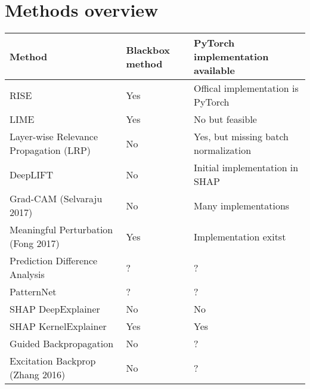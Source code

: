 \section{Methods overview}

\begin{tabular}{| p{7cm} | p{2.5cm} | p{6cm} | }
\hline
\textbf{Method} & \textbf{Blackbox method} & \textbf{PyTorch implementation available} \\ \hline

RISE\cite{Petsiuk2018rise} & Yes & Offical implementation is PyTorch \\ \hline
LIME\cite{ribeiro2016should} & Yes & No but feasible \\ \hline
Layer-wise Relevance Propagation (LRP) & No & Yes, but missing batch normalization\cite{lrppytorch} \\ \hline
DeepLIFT\cite{shrikumar2017learning} & No & Initial implementation in SHAP\cite{NIPS2017_7062} \\ \hline
Grad-CAM (Selvaraju 2017) & No & Many implementations \\ \hline
Meaningful Perturbation (Fong 2017)\cite{fong2017interpretable} & Yes & Implementation exitst \cite{fong2017implementation} \\ \hline

Prediction Difference Analysis \cite{todo} & ? & ? \\ \hline
PatternNet & ? & ? \\ \hline
SHAP DeepExplainer\cite{NIPS2017_7062} & No & No \\ \hline
SHAP KernelExplainer\cite{NIPS2017_7062} & Yes & Yes \\ \hline

Guided Backpropagation  & No & ? \\ \hline
Excitation Backprop (Zhang 2016)\cite{todo} & No & ? \\ \hline


\end{tabular}



